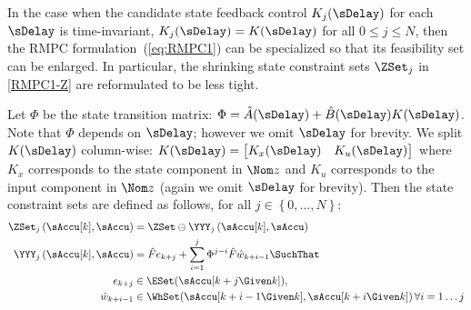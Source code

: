 In the case when the candidate state feedback control $K_{j}(\sDelay)$
for each $\sDelay$ is time-invariant, \ie $K_{j}(\sDelay)=K(\sDelay)$
for all $0\leq j\leq N$, then the RMPC formulation~(\ref{eq:RMPC1})
can be specialized so that its feasibility set can be enlarged. In
particular, the shrinking state constraint sets $\ZSet_{j}$ in \eqref{RMPC1-Z}
are reformulated to be less tight.

Let $\Phi$ be the state transition matrix: $\Phi=\hat{A}(\sDelay)+\hat{B}(\sDelay)K(\sDelay)$.
Note that $\Phi$ depends on $\sDelay$; however we omit $\sDelay$
for brevity. We split $K(\sDelay)$ column-wise: $K(\sDelay)=\begin{bmatrix}K_{x}(\sDelay) & K_{u}(\sDelay)\end{bmatrix}$
where $K_{x}$ corresponds to the state component in $\Nom z$ and
$K_{u}$ corresponds to the input component in $\Nom z$ (again we
omit $\sDelay$ for brevity). Then the state constraint sets are defined
as follows, for all $j\in\left\{ 0,\dots,N\right\} $: \begin{subequations}
\begin{align}
\ZSet_{j}\left(\sAccu[k],\sAccu\right)&=\ZSet\ominus\YYY_{j}\left(\sAccu[k],\sAccu\right)\label{eq:RMPC2-Zj}\\
\YYY_{j}\left(\sAccu[k],\sAccu\right)&= \hat{F}e_{k+j}+\sum_{i=1}^{j}\Phi^{j-i}\hat{F}\hat{w}_{k+i-1} 
\SuchThat \nonumber \\
e_{k+j}&\in\ESet(\sAccu[k+j\Given k]),\nonumber \\
\hat{w}_{k+i-1}&\in\WhSet(\sAccu[k+i-1\Given k],\sAccu[k+i\Given k])\,\forall i=1\dots j \label{eq:RMPC2-Yj}
\end{align}
\label{eq:RMPC2-Z}\end{subequations}

\begin{comment}
\begin{subequations}
\begin{gather}
\ZSet_{j}\left(\sAccu[k],\sAccu\right)=\ZSet\ominus\YYY_{j}\left(\sAccu[k],\sAccu\right)\label{eq:RMPC2-Zj}\\
\YYY_{j}\left(\sAccu[k],\sAccu\right)=\left\{ \hat{F}e_{k+j}+\sum_{i=1}^{j}\Phi^{j-i}\hat{F}\hat{w}_{k+i-1} \\
\SuchThat e_{k+j}\in\ESet(\sAccu[k+j\Given k]),\hat{w}_{k+i-1}\in\WhSet(\sAccu[k+i-1\Given k],\sAccu[k+i\Given k])\,\forall i=1\dots j\right\} \label{eq:RMPC2-Yj}
\end{gather}
\label{eq:RMPC2-Z}\end{subequations}
\end{comment}


